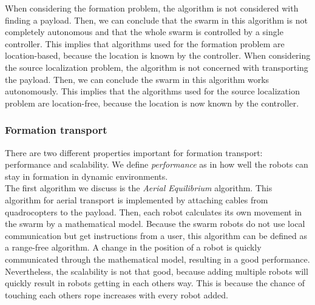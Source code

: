 When considering the formation problem, the algorithm is not considered with finding a payload. 
Then, we can conclude that the swarm in this algorithm is not completely autonomous and that the whole swarm is controlled by a single controller.
This implies that algorithms used for the formation problem are location-based, because the location is known by the controller. \cite{Michael2011cooperative,mas2012object}
When considering the source localization problem, the algorithm is not concerned with transporting the payload. 
Then, we can conclude the swarm in this algorithm works autonomously. 
This implies that the algorithms used for the source localization problem are location-free, because the location is now known by the controller. \cite{Rubenstein2013collecive, sugawara2012object}

\subsubsection{Formation transport}
There are two different properties important for formation transport: performance and scalability. 
We define \emph{performance} as in how well the robots can stay in formation in dynamic environments. \\

The first algorithm we discuss is the \emph{Aerial Equilibrium} algorithm. \cite{Michael2011cooperative}
This algorithm for aerial transport is implemented by attaching cables from quadrocopters to the payload.
Then, each robot calculates its own movement in the swarm by a mathematical model. 
Because the swarm robots do not use local communication but get instructions from a user, this algorithm can be defined as a range-free algorithm. 
A change in the position of a robot is quickly communicated through the mathematical model, resulting in a good performance.
Nevertheless, the scalability is not that good, because adding multiple robots will quickly result in robots getting in each others way.
This is because the chance of touching each others rope increases with every robot added. \\

